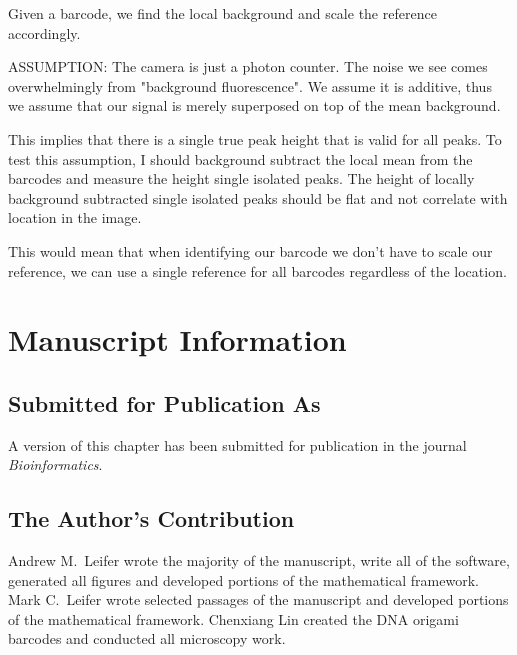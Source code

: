 Given a barcode, we find the local background and scale the reference accordingly. 

ASSUMPTION: The camera is just a photon counter. The noise we see comes overwhelmingly from "background fluorescence". We assume it is additive, thus we assume that our signal is merely superposed on top of the mean background. 

This implies that there is a single true peak height that is valid for all peaks. To test this assumption, I should background subtract the local mean from the barcodes and measure the height single isolated peaks. The height of locally background subtracted single isolated peaks should be flat and not correlate with location in the image.

This would mean that when identifying our barcode we don't have to scale our reference, we can use a single reference for all barcodes regardless of the location.


\section{Manuscript Information}
\subsection{Submitted for Publication As}
A version of this chapter has been submitted for publication in the journal \textit{Bioinformatics}.

\subsection{The Author's Contribution}
Andrew M.~Leifer wrote the majority of the manuscript, write all of the software, generated all figures and developed portions of the mathematical framework. Mark C.~Leifer wrote selected passages of the manuscript and developed portions of the mathematical framework. Chenxiang Lin created the DNA origami barcodes and conducted all microscopy work. 
 